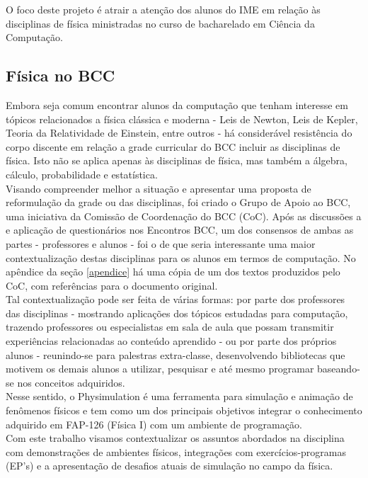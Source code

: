 
O foco deste projeto é atrair a atenção dos alunos do IME em relação às disciplinas de física ministradas no curso de bacharelado em Ciência da Computação.

\subsection{Física no BCC}
Embora seja comum encontrar alunos da computação que tenham interesse em tópicos relacionados a física clássica e moderna - Leis de Newton, Leis de Kepler, Teoria da Relatividade de Einstein, entre outros - há considerável resistência do corpo discente em relação a grade curricular do BCC incluir as disciplinas de física. Isto não se aplica apenas às disciplinas de física, mas também a álgebra, cálculo, probabilidade e estatística. \\

Visando compreender melhor a situação e apresentar uma proposta de reformulação da grade ou das disciplinas, foi criado o Grupo de Apoio ao BCC, uma iniciativa da Comissão de Coordenação do BCC (CoC). Após as discussões a e aplicação de questionários nos Encontros BCC, um dos consensos de ambas as partes - professores e alunos - foi o de que seria interessante uma maior contextualização destas disciplinas para os alunos em termos de computação. No apêndice da seção \ref{apendice} há uma cópia de um dos textos produzidos pelo CoC, com referências para o documento original. \\

Tal contextualização pode ser feita de várias formas: por parte dos professores das disciplinas - mostrando aplicações dos tópicos estudadas para computação, trazendo professores ou especialistas em sala de aula que possam transmitir experiências relacionadas ao conteúdo aprendido - ou por parte dos próprios alunos - reunindo-se para palestras extra-classe, desenvolvendo bibliotecas que motivem os demais alunos a utilizar, pesquisar e até mesmo programar baseando-se nos conceitos adquiridos. \\

Nesse sentido, o Physimulation é uma ferramenta para simulação e animação de fenômenos físicos e tem como um dos principais objetivos integrar o conhecimento adquirido em FAP-126 (Física I) com um ambiente de programação. \\

Com este trabalho visamos contextualizar os assuntos abordados na disciplina com demonstrações de ambientes físicos, integrações com exercícios-programas (EP's) e a apresentação de desafios atuais de simulação no campo da física. 

